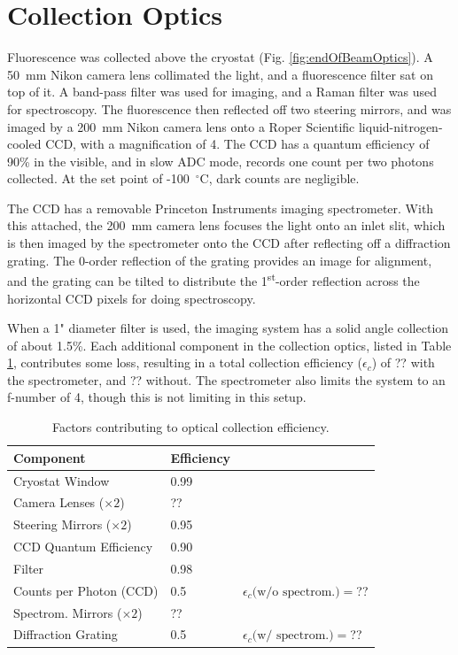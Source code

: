 \section{Collection Optics}
\label{sec:collection}

Fluorescence was collected above the cryostat (Fig. \ref{fig:endOfBeamOptics}).  A 50~mm Nikon camera lens collimated the light, and a fluorescence filter sat on top of it.  A band-pass filter was used for imaging, and a Raman filter was used for spectroscopy.  The fluorescence then reflected off two steering mirrors, and was imaged by a 200~mm Nikon camera lens onto a Roper Scientific liquid-nitrogen-cooled CCD, with a magnification of 4.  The CCD has a quantum efficiency of 90\% in the visible, and in slow ADC mode, records one count per two photons collected.  At the set point of -100~$^{\circ}$C, dark counts are negligible.

The CCD has a removable Princeton Instruments imaging spectrometer.  With this attached, the 200~mm camera lens focuses the light onto an inlet slit, which is then imaged by the spectrometer onto the CCD after reflecting off a diffraction grating.  The 0-order reflection of the grating provides an image for alignment, and the grating can be tilted to distribute the 1\textsuperscript{st}-order reflection across the horizontal CCD pixels for doing spectroscopy.

When a 1" diameter filter is used, the imaging system has a solid angle collection of about 1.5\%.  Each additional component in the collection optics, listed in Table \ref{table:colleff}, contributes some loss, resulting in a total collection efficiency ($\epsilon_{c}$) of {\color{red}??} with the spectrometer, and {\color{red}??} without.  The spectrometer also limits the system to an f-number of 4, though this is not limiting in this setup.

\begin{table} [!htbp]
\caption{Factors contributing to optical collection efficiency.}
\label{table:colleff}
\begin{tabular}{l l l}
Component & Efficiency & \\
\hline
Cryostat Window & 0.99 & \\
Camera Lenses ($\times 2$) & {\color{red}??} & \\
Steering Mirrors ($\times 2$) & 0.95 & \\
CCD Quantum Efficiency & 0.90 & \\
Filter & 0.98 & \\
Counts per Photon (CCD) & 0.5 & $\epsilon_{c}\text{(w/o spectrom.)} = ${\color{red}??}\\
\hline
Spectrom. Mirrors ($\times 2$) & {\color{red}??} & \\
Diffraction Grating & 0.5 & $\epsilon_{c}\text{(w/ spectrom.)} = ${\color{red}??}\\
\end{tabular}
\end{table}

